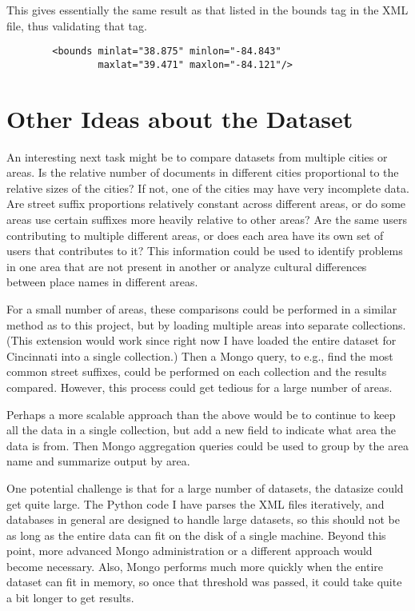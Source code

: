 \documentclass{article}
\begin{document}
        This gives essentially the same result as that listed in the bounds tag
        in the XML file, thus validating that tag.

        \begin{lstlisting}
        <bounds minlat="38.875" minlon="-84.843"
                maxlat="39.471" maxlon="-84.121"/>
        \end{lstlisting}

        
    \section{Other Ideas about the Dataset}
    An interesting next task might be to compare datasets from multiple cities
    or areas. Is the relative number of documents in different cities
    proportional to the relative sizes of the cities? If not, one of the cities
    may have very incomplete data. Are street suffix proportions relatively
    constant across different areas, or do some areas use certain suffixes more
    heavily relative to other areas? Are the same users contributing to multiple
    different areas, or does each area have its own set of users that
    contributes to it? This information could be used to identify problems in
    one area that are not present in another or analyze cultural differences
    between place names in different areas.

    For a small number of areas, these comparisons could be performed in a
    similar method as to this project, but by loading multiple areas into
    separate collections. (This extension would work since right now I have
    loaded the entire dataset for Cincinnati into a single collection.) Then
    a Mongo query, to e.g., find the most common street suffixes, could be
    performed on each collection and the results compared. However, this process
    could get tedious for a large number of areas.

    Perhaps a more scalable approach than the above would be to continue to keep
    all the data in a single collection, but add a new field to indicate what
    area the data is from. Then Mongo aggregation queries could be used to group
    by the area name and summarize output by area.

    One potential challenge is that for a large number of datasets, the datasize
    could get quite large. The Python code I have parses the XML files
    iteratively, and databases in general are designed to handle large datasets,
    so this should not be as long as the entire data can fit on the disk of a
    single machine. Beyond this point, more advanced Mongo administration or a
    different approach would become necessary. Also, Mongo performs much more
    quickly when the entire dataset can fit in memory, so once that threshold
    was passed, it could take quite a bit longer to get results.
\end{document}
